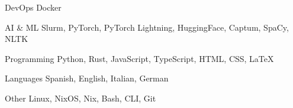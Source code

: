 

\begin{cvskills}

  \cvskill
    {DevOps} %
    {Docker} %

  \cvskill
    {AI \& ML} %
    {Slurm, PyTorch, PyTorch Lightning, HuggingFace, Captum, SpaCy, NLTK} %

  \cvskill
    {Programming} %
    {Python, Rust, JavaScript, TypeScript, HTML, CSS, LaTeX} %

  \cvskill
    {Languages} %
    {Spanish, English, Italian, German} %

  \cvskill
    {Other}
    {Linux, NixOS, Nix, Bash, CLI, Git}

\end{cvskills}
